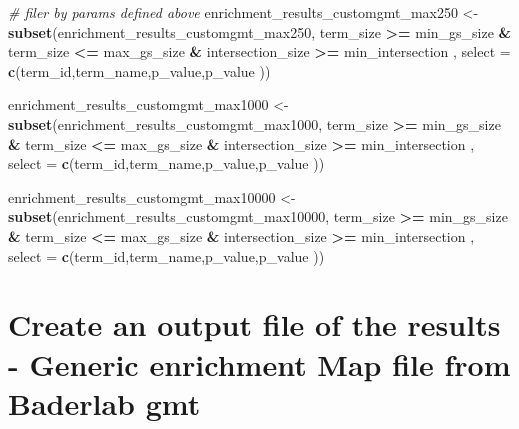 \documentclass[
]{book}
\newenvironment{Shaded}{\begin{snugshade}}{\end{snugshade}}
\newcommand{\AttributeTok}[1]{\textcolor[rgb]{0.13,0.29,0.53}{#1}}
\newcommand{\CommentTok}[1]{\textcolor[rgb]{0.56,0.35,0.01}{\textit{#1}}}
\newcommand{\FunctionTok}[1]{\textcolor[rgb]{0.13,0.29,0.53}{\textbf{#1}}}
\newcommand{\NormalTok}[1]{#1}
\newcommand{\OtherTok}[1]{\textcolor[rgb]{0.56,0.35,0.01}{#1}}
\newcommand{\SpecialCharTok}[1]{\textcolor[rgb]{0.81,0.36,0.00}{\textbf{#1}}}
\begin{document}
\begin{Shaded}
\begin{Highlighting}[]
\CommentTok{\# filer by params defined above}
\NormalTok{enrichment\_results\_customgmt\_max250 }\OtherTok{\textless{}{-}} \FunctionTok{subset}\NormalTok{(enrichment\_results\_customgmt\_max250,}
\NormalTok{                                       term\_size }\SpecialCharTok{\textgreater{}=}\NormalTok{ min\_gs\_size }\SpecialCharTok{\&} 
\NormalTok{                                   term\_size }\SpecialCharTok{\textless{}=}\NormalTok{ max\_gs\_size }\SpecialCharTok{\&} 
\NormalTok{                                   intersection\_size }\SpecialCharTok{\textgreater{}=}\NormalTok{ min\_intersection , }
                                 \AttributeTok{select =} \FunctionTok{c}\NormalTok{(term\_id,term\_name,p\_value,p\_value ))}

\NormalTok{enrichment\_results\_customgmt\_max1000 }\OtherTok{\textless{}{-}} \FunctionTok{subset}\NormalTok{(enrichment\_results\_customgmt\_max1000,}
\NormalTok{                                       term\_size }\SpecialCharTok{\textgreater{}=}\NormalTok{ min\_gs\_size }\SpecialCharTok{\&} 
\NormalTok{                                   term\_size }\SpecialCharTok{\textless{}=}\NormalTok{ max\_gs\_size }\SpecialCharTok{\&} 
\NormalTok{                                   intersection\_size }\SpecialCharTok{\textgreater{}=}\NormalTok{ min\_intersection , }
                                 \AttributeTok{select =} \FunctionTok{c}\NormalTok{(term\_id,term\_name,p\_value,p\_value ))}

\NormalTok{enrichment\_results\_customgmt\_max10000 }\OtherTok{\textless{}{-}} \FunctionTok{subset}\NormalTok{(enrichment\_results\_customgmt\_max10000,}
\NormalTok{                                       term\_size }\SpecialCharTok{\textgreater{}=}\NormalTok{ min\_gs\_size }\SpecialCharTok{\&} 
\NormalTok{                                   term\_size }\SpecialCharTok{\textless{}=}\NormalTok{ max\_gs\_size }\SpecialCharTok{\&} 
\NormalTok{                                   intersection\_size }\SpecialCharTok{\textgreater{}=}\NormalTok{ min\_intersection , }
                                 \AttributeTok{select =} \FunctionTok{c}\NormalTok{(term\_id,term\_name,p\_value,p\_value ))}
\end{Highlighting}
\end{Shaded}

\section{Create an output file of the results - Generic enrichment Map file from Baderlab gmt}\label{create-an-output-file-of-the-results---generic-enrichment-map-file-from-baderlab-gmt}
\end{document}
